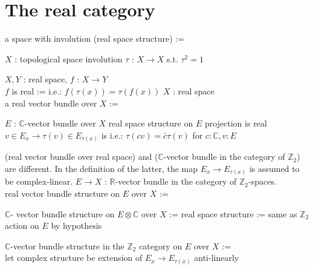 \documentclass[dvipdfmx]{jsarticle}
\begin{document}
\section*{The real category}

\begin{Definition}
\itemdefi
  \Define a space with involution (real space structure) :=
  \begin{itemize}
    \itembase \(X\) : topological space
    \itemenum involution \(\tau\) : \(X \to X\) s.t. \(\tau^2=1\)
  \end{itemize}
\itemdefi
  \For \(X,Y\) : real space, \(f\) : \(X \to Y\) \\
  \Define \(f\) is real :=  i.e.: \(f(\tau(x)) = \tau(f(x))\)
\itemdefi
  \For \(X\) : real space \\
  \Define a real vector bundle over \(X\) :=
  \begin{itemize}
    \itembase \(E\) : \(\mathbb{C}\)-vector bundle over \(X\)
    \itemenum real space structure on \(E\)
    \itemwith projection is real
    \itemwith \(v \in E_x \to \tau(v) \in E_{\tau(x)}\) is  i.e.: \(\tau(cv) = \bar{c} \tau(v)\) for \(c:\mathbb{C}, v:E\)
  \end{itemize}
\itemnote
  (real vector bundle over real space) and (\(\mathbb{C}\)-vector bundle in the category of \(\mathbb{Z}_2\)) are different. In the definition of the latter, the map \(E_x \to E_{\tau (x)}\) is assumed to be complex-linear.
\itemdefi
  \For \(E \to X\) : \(\mathbb{R}\)-vector bundle in the category of \(\mathbb{Z}_2\)-spaces. \\
  \Define real vector bundle structure on \(E\) over \(X\) :=
  \begin{itemize}
    \itembase \(\mathbb{C}\)- vector bundle structure on \(E \otimes \mathbb{C}\) over \(X\) := 
    \itemenum real space structure := same as \(\mathbb{Z}_2\) action on \(E\)
    \itemwith by hypothesis
    \itemwith 
  \end{itemize}
  \Define \(\mathbb{C}\)-vector bundle structure in the \(\mathbb{Z}_2\) category on \(E\) over \(X\) := \\
  let complex structure be extension of \(E_{x} \to E_{\tau (x)}\) anti-linearly 
\end{Definition}
\end{document}
